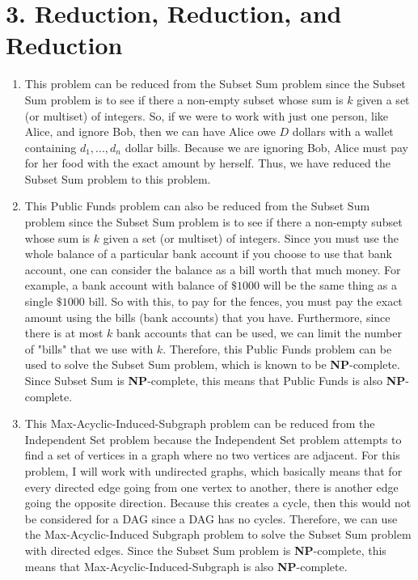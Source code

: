 \documentclass[11pt]{article}
\begin{document}
\newpage
\section*{3. Reduction, Reduction, and Reduction}
\begin{enumerate}[label=\arabic*.]
\item
This problem can be reduced from the Subset Sum problem since the Subset Sum problem is to see if there a non-empty subset whose sum is $k$ given a set (or multiset) of integers. So, if we were to work with just one person, like Alice, and ignore Bob, then we can have Alice owe $D$ dollars with a wallet containing ${d_1, ..., d_n}$ dollar bills. Because we are ignoring Bob, Alice must pay for her food with the exact amount by herself. Thus, we have reduced the Subset Sum problem to this problem.



\item
This Public Funds problem can also be reduced from the Subset Sum problem since the Subset Sum problem is to see if there a non-empty subset whose sum is $k$ given a set (or multiset) of integers. Since you must use the whole balance of a particular bank account if you choose to use that bank account, one can consider the balance as a bill worth that much money. For example, a bank account with balance of $\$1000$ will be the same thing as a single $\$1000$ bill. So with this, to pay for the fences, you must pay the exact amount using the bills (bank accounts) that you have. Furthermore, since there is at most $k$ bank accounts that can be used, we can limit the number of "bills" that we use with $k$. Therefore, this Public Funds problem can be used to solve the Subset Sum problem, which is known to be \textbf{NP}-complete. Since Subset Sum is \textbf{NP}-complete, this means that Public Funds is also \textbf{NP}-complete.



\item
This Max-Acyclic-Induced-Subgraph problem can be reduced from the Independent Set problem because the Independent Set problem attempts to find a set of vertices in a graph where no two vertices are adjacent. For this problem, I will work with undirected graphs, which basically means that for every directed edge going from one vertex to another, there is another edge going the opposite direction. Because this creates a cycle, then this would not be considered for a DAG since a DAG has no cycles. Therefore, we can use the Max-Acyclic-Induced Subgraph problem to solve the Subset Sum problem with directed edges. Since the Subset Sum problem is \textbf{NP}-complete, this means that Max-Acyclic-Induced-Subgraph is also \textbf{NP}-complete.
\end{enumerate}
\end{document}
